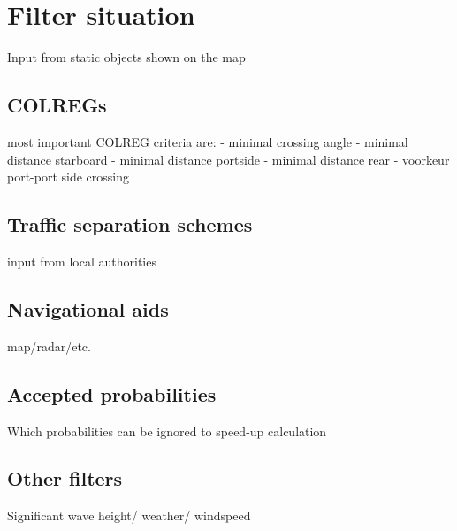 \chapter{Filter situation}
Input from static objects shown on the map

\section{COLREGs}
most important COLREG criteria are:
- minimal crossing angle
- minimal distance starboard
- minimal distance portside
- minimal distance rear
- voorkeur port-port side crossing

\section{Traffic separation schemes}
input from local authorities

\section{Navigational aids}
map/radar/etc.

\section{Accepted probabilities}
Which probabilities can be ignored to speed-up calculation

\section{Other filters}
Significant wave height/ weather/ windspeed

